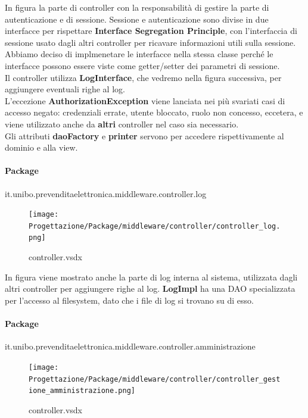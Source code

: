 \documentclass[a4paper]{article}
\begin{document}
In figura la parte di controller con la responsabilità di gestire la parte di autenticazione e di sessione. Sessione e autenticazione sono divise in due interfacce per rispettare \textbf{Interface Segregation Principle}, con l'interfaccia di sessione usato dagli altri controller per ricavare informazioni utili sulla sessione. Abbiamo deciso di implmenetare le interfacce nella stessa classe perché le interfacce possono essere viste come getter/setter dei parametri di sessione.\\Il controller utilizza \textbf{LogInterface}, che vedremo nella figura successiva, per aggiungere eventuali righe al log.\\L'eccezione \textbf{AuthorizationException} viene lanciata nei più svariati casi di accesso negato: credenziali errate, utente bloccato, ruolo non concesso, eccetera, e viene utilizzato anche da \textbf{altri} controller nel caso sia necessario.\\Gli attributi \textbf{daoFactory} e \textbf{printer} servono per accedere rispettivamente al dominio e alla view.

\newpage

\paragraph{Package} it.unibo.prevenditaelettronica.middleware.controller.log


\begin{figure}[H]
    \texttt{[image: Progettazione/Package/middleware/controller/controller\_log.png]}
    \centering
    \caption{controller.vsdx}
\end{figure}

In figura viene mostrato anche la parte di log interna al sistema, utilizzata dagli altri controller per aggiungere righe al log. \textbf{LogImpl} ha una DAO specializzata per l'accesso al filesystem, dato che i file di log si trovano su di esso.

\paragraph{Package} it.unibo.prevenditaelettronica.middleware.controller.amministrazione


\begin{figure}[H]
    \texttt{[image: Progettazione/Package/middleware/controller/controller\_gestione\_amministrazione.png]}
    \centering
    \caption{controller.vsdx}
\end{figure}
\end{document}
